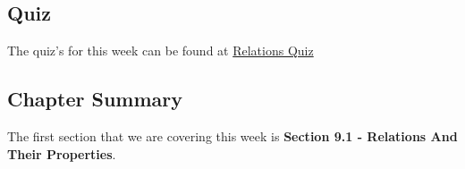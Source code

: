 \subsection{Quiz}

The quiz's for this week can be found at \href{https://applied.cs.colorado.edu/mod/quiz/view.php?id=51863}{Relations Quiz} \textbullet {}  

\subsection{Chapter Summary}

The first section that we are covering this week is \textbf{Section 9.1 - Relations And Their Properties}.

